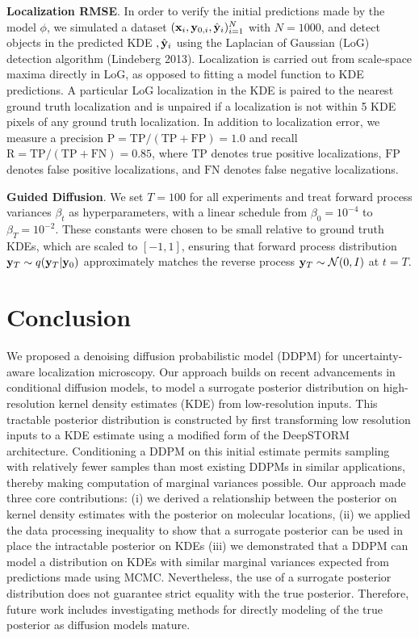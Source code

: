 \documentclass{article}
\begin{document}
\textbf{Localization RMSE}. In order to verify the initial predictions made by the model $\phi$, we simulated a dataset $(\bold{x}_i,\bold{y}_{0,i},\hat{\bold{y}}_{i})_{i=1}^{N}$ with $N=1000$, and  detect objects in the predicted KDE $,\hat{\bold{y}}_{i}$ using the Laplacian of Gaussian (LoG) detection algorithm (Lindeberg 2013). Localization is carried out from scale-space maxima directly in LoG, as opposed to fitting a model function to KDE predictions. A particular LoG localization in the KDE is paired to the nearest ground truth localization and is unpaired if a localization is not within 5 KDE pixels of any ground truth localization. In addition to localization error, we measure a precision $\mathrm{P = TP/(TP + FP)} = 1.0$ and recall $\mathrm{R = TP/(TP + FN)} = 0.85$, where $\mathrm{TP}$ denotes true positive localizations, $\mathrm{FP}$ denotes false positive localizations, and $\mathrm{FN}$ denotes false negative localizations.


\textbf{Guided Diffusion}. We set $T = 100$ for all experiments and treat forward process variances $\beta_{t}$ as hyperparameters, with a linear schedule from $\beta_{0}=10^{-4}$ to $\beta_{T}=10^{-2}$.
These constants were chosen to be small relative to ground truth KDEs, which are scaled to $[-1,1]$, ensuring that forward process distribution $\bold{y}_{T}\sim q(\bold{y}_{T}|\bold{y}_{0})$ approximately matches the reverse process $\bold{y}_T\sim \mathcal{N}(0, I)$ at $t=T$.


\section{Conclusion}

We proposed a denoising diffusion probabilistic model (DDPM) for uncertainty-aware localization microscopy. Our approach builds on recent advancements in conditional diffusion models, to model a surrogate posterior distribution on high-resolution kernel density estimates (KDE) from low-resolution inputs. This tractable posterior distribution is constructed by first transforming low resolution inputs to a KDE estimate using a modified form of the DeepSTORM architecture. Conditioning a DDPM on this initial estimate permits sampling with relatively fewer samples than most existing DDPMs in similar applications, thereby making computation of marginal variances possible. Our approach made three core contributions: (i) we derived a relationship between the posterior on kernel density estimates with the posterior on molecular locations, (ii) we applied the data processing inequality to show that a surrogate posterior can be used in place the intractable posterior on KDEs (iii) we demonstrated that a DDPM can model a distribution on KDEs with similar marginal variances expected from predictions made using MCMC. Nevertheless, the use of a surrogate posterior distribution does not guarantee strict equality with the true posterior. Therefore, future work includes investigating methods for directly modeling of the true posterior as diffusion models mature. 
\end{document}
